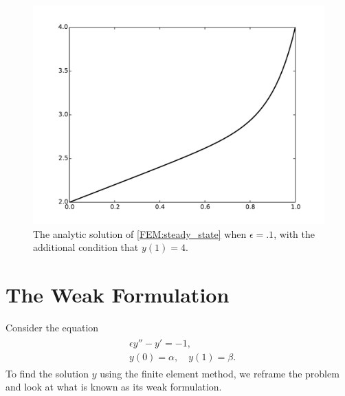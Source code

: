 \begin{figure}[ht]
\centering
\includegraphics[width=\textwidth]{FEM_solution.pdf}
\caption{The analytic solution of \eqref{FEM:steady_state} when $\epsilon = .1$, with the additional condition that $y(1) = 4$.}
\label{FEM:analytic_solution}
\end{figure}


\section*{The Weak Formulation}
Consider the equation
\begin{align}
	\begin{split}
	&{ }\epsilon y'' - y' = -1,\\
	&{ }y(0) = \alpha, \quad y(1) = \beta . 
	\end{split}\label{FEM:eqn1}
\end{align}
To find the solution $y$ using the finite element method, we reframe the problem and look at what is known as its weak formulation. 

